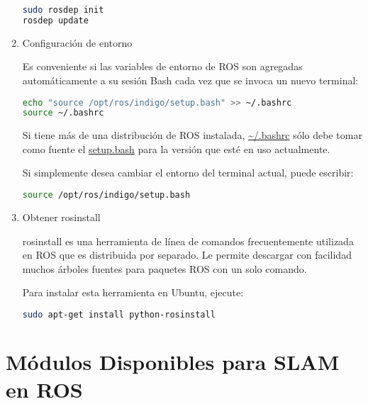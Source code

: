 \begin{enumerate}
	\begin{blackcodebox}
	\begin{lstlisting}[language=bash]
sudo rosdep init
rosdep update
	\end{lstlisting}
	\end{blackcodebox}

	\item Configuración de entorno

	Es conveniente si las variables de entorno de ROS son agregadas automáticamente a su sesión Bash cada vez que se invoca un nuevo terminal:

	\begin{blackcodebox}
	\begin{lstlisting}[language=bash]
echo "source /opt/ros/indigo/setup.bash" >> ~/.bashrc
source ~/.bashrc
	\end{lstlisting}
	\end{blackcodebox}

	Si tiene más de una distribución de ROS instalada, \url{~/.bashrc} sólo debe tomar como fuente el \url{setup.bash} para la versión que esté en uso actualmente.

	Si simplemente desea cambiar el entorno del terminal actual, puede escribir:

	\begin{blackcodebox}
	\begin{lstlisting}[language=bash]
source /opt/ros/indigo/setup.bash
	\end{lstlisting}
	\end{blackcodebox}

	\item Obtener rosinstall

rosinstall es una herramienta de línea de comandos frecuentemente utilizada en ROS que es distribuida por separado. Le permite descargar con facilidad muchos árboles fuentes para paquetes ROS con un solo comando.

Para instalar esta herramienta en Ubuntu, ejecute:

	\begin{blackcodebox}
	\begin{lstlisting}[language=bash]
sudo apt-get install python-rosinstall
	\end{lstlisting}
	\end{blackcodebox}
\end{enumerate}

\section{Módulos Disponibles para SLAM en ROS}

